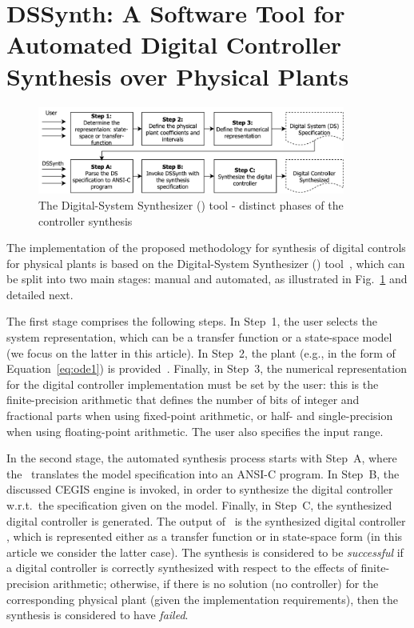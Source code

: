 \fi

\section{DSSynth: A Software Tool for Automated Digital Controller Synthesis over Physical Plants}
\label{sec:dssynthtool}

\begin{figure}[t]
\centering
\includegraphics[width=0.9\textwidth]{figures/synthesis-flow.pdf}
\caption{The Digital-System Synthesizer (\tool) tool - distinct phases of the controller synthesis }
\label{fig:synthesis-flow}
\end{figure}

The implementation of the proposed methodology for synthesis of digital controls for physical plants is based on the Digital-System Synthesizer 
(\tool) tool~\cite{DBLP:conf/kbse/AbateBCCCDKKP17}, 
which can be split into two main stages: manual and automated, as illustrated in Fig.~\ref{fig:synthesis-flow} and detailed next. 

The first stage comprises the following steps. 
In Step~1, the user selects the system representation, which can be a transfer function or a state-space model (we focus on the latter in this article).   
In Step~2, the plant (e.g., in the form of Equation~\eqref{eq:ode1}) is provided~\cite{astrom1997computer}.  
Finally, in Step~3, the numerical representation for the digital controller implementation must be set by the user: 
this is the finite-precision arithmetic that defines the number of bits of integer and fractional parts when using fixed-point arithmetic, 
or half- and single-precision when using floating-point arithmetic. 
The user also specifies the input range.  

In the second stage, 
the automated synthesis process starts with Step~A, where the
\tool~translates the model specification into an ANSI-C program.  
In Step~B, the discussed CEGIS engine is invoked, 
in order to synthesize the digital controller w.r.t.~the specification given on the model.  
Finally, in Step~C, the synthesized digital controller is generated.  
The output of \tool~is the synthesized digital controller , 
which is represented either as a transfer function or in state-space form (in this article we consider the latter case).  
The synthesis is considered to be \emph{successful} if a digital controller is
correctly synthesized with respect to the effects of finite-precision arithmetic; 
otherwise, if there is no solution (no controller) for the corresponding physical plant (given the implementation requirements), 
then the synthesis is considered to have \emph{failed}. 

